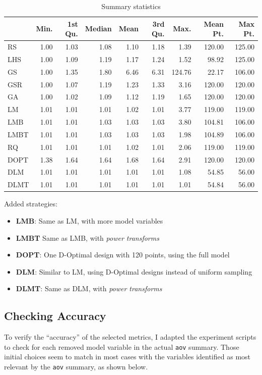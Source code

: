 \documentclass[final,12pt,a4paper]{article}
\begin{document}
\begin{table}[ht]
\centering
\begingroup\small
\begin{tabular}{lrrrrrrrr}
  \hline
 & Min. & 1st Qu. & Median & Mean & 3rd Qu. & Max. & Mean Pt. & Max Pt. \\
  \hline
RS & 1.00 & 1.03 & 1.08 & 1.10 & 1.18 & 1.39 & 120.00 & 125.00 \\
  LHS & 1.00 & 1.09 & 1.19 & 1.17 & 1.24 & 1.52 & 98.92 & 125.00 \\
  GS & 1.00 & 1.35 & 1.80 & 6.46 & 6.31 & 124.76 & 22.17 & 106.00 \\
  GSR & 1.00 & 1.07 & 1.19 & 1.23 & 1.33 & 3.16 & 120.00 & 120.00 \\
  GA & 1.00 & 1.02 & 1.09 & 1.12 & 1.19 & 1.65 & 120.00 & 120.00 \\
  LM & 1.01 & 1.01 & 1.01 & 1.02 & 1.01 & 3.77 & 119.00 & 119.00 \\
  LMB & 1.01 & 1.01 & 1.03 & 1.03 & 1.03 & 3.80 & 104.81 & 106.00 \\
  LMBT & 1.01 & 1.01 & 1.03 & 1.03 & 1.03 & 1.98 & 104.89 & 106.00 \\
  RQ & 1.01 & 1.01 & 1.01 & 1.02 & 1.01 & 2.06 & 119.00 & 119.00 \\
  DOPT & 1.38 & 1.64 & 1.64 & 1.68 & 1.64 & 2.91 & 120.00 & 120.00 \\
  DLM & 1.01 & 1.01 & 1.01 & 1.01 & 1.01 & 1.08 & 54.85 & 56.00 \\
  DLMT & 1.01 & 1.01 & 1.01 & 1.01 & 1.01 & 1.01 & 54.84 & 56.00 \\
   \hline
\end{tabular}
\endgroup
\caption{Summary statistics}
\end{table}

Added strategies:
\begin{itemize}
\item \textbf{LMB}: Same as LM, with more model variables
\item \textbf{LMBT} Same as LMB, with \emph{power transforms}
\item \textbf{DOPT}: One D-Optimal design with 120 points, using the full model
\item \textbf{DLM}: Similar to LM, using D-Optimal designs instead of uniform sampling
\item \textbf{DLMT}: Same as DLM, with \emph{power transforms}
\end{itemize}

\subsection{Checking Accuracy}
\label{sec:orgda1db91}
To verify the ``accuracy'' of the selected metrics, I adapted the experiment
scripts to check for each removed model variable in the actual \texttt{aov} summary.
Those initial choices seem to match in most cases with the variables identified
as most relevant by the \texttt{aov} summary, as shown below.
\end{document}
